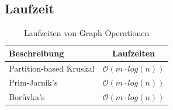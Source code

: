 \subsection{Laufzeit}
\begin{table}[h]
	\centering
	\begin{tabu} to \linewidth {l c}
		\toprule
		Beschreibung & Laufzeiten \\
		\midrule
		Partition-based Kruskal & $\mathcal{O}(m \cdot log(n))$\\
		Prim-Jarnik's & $\mathcal{O}(m \cdot log(n))$\\
		Borůvka's & $\mathcal{O}(m \cdot log(n))$\\
		\bottomrule
	\end{tabu}
	\caption{Laufzeiten von Graph Operationen}
\end{table}




